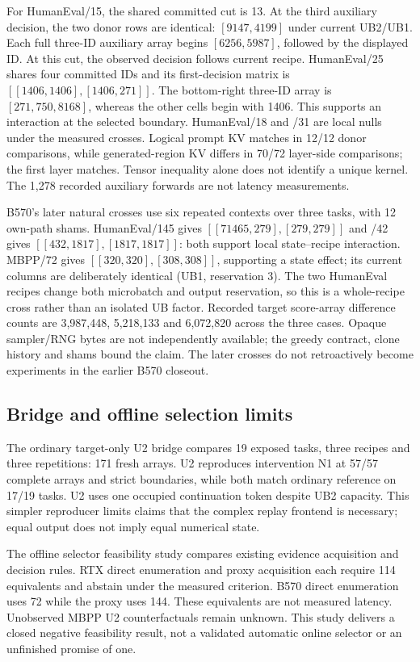 For HumanEval/15, the shared committed cut is 13. At the third auxiliary decision, the two donor rows are identical: $[9147,4199]$ under current UB2/UB1. Each full three-ID auxiliary array begins $[6256,5987]$, followed by the displayed ID. At this cut, the observed decision follows current recipe. HumanEval/25 shares four committed IDs and its first-decision matrix is $[[1406,1406],[1406,271]]$. The bottom-right three-ID array is $[271,750,8168]$, whereas the other cells begin with 1406. This supports an interaction at the selected boundary. HumanEval/18 and /31 are local nulls under the measured crosses. Logical prompt KV matches in 12/12 donor comparisons, while generated-region KV differs in 70/72 layer-side comparisons; the first layer matches. Tensor inequality alone does not identify a unique kernel. The 1,278 recorded auxiliary forwards are not latency measurements.

B570's later natural crosses use six repeated contexts over three tasks, with 12 own-path shams. HumanEval/145 gives $[[71465,279],[279,279]]$ and /42 gives $[[432,1817],[1817,1817]]$: both support local state--recipe interaction. MBPP/72 gives $[[320,320],[308,308]]$, supporting a state effect; its current columns are deliberately identical (UB1, reservation 3). The two HumanEval recipes change both microbatch and output reservation, so this is a whole-recipe cross rather than an isolated UB factor. Recorded target score-array difference counts are 3,987,448, 5,218,133 and 6,072,820 across the three cases. Opaque sampler/RNG bytes are not independently available; the greedy contract, clone history and shams bound the claim. The later crosses do not retroactively become experiments in the earlier B570 closeout.

\subsection{Bridge and offline selection limits}
\label{supp:bridge_selector}
The ordinary target-only U2 bridge compares 19 exposed tasks, three recipes and three repetitions: 171 fresh arrays. U2 reproduces intervention N1 at 57/57 complete arrays and strict boundaries, while both match ordinary reference on 17/19 tasks. U2 uses one occupied continuation token despite UB2 capacity. This simpler reproducer limits claims that the complex replay frontend is necessary; equal output does not imply equal numerical state.

The offline selector feasibility study compares existing evidence acquisition and decision rules. RTX direct enumeration and proxy acquisition each require 114 equivalents and abstain under the measured criterion. B570 direct enumeration uses 72 while the proxy uses 144. These equivalents are not measured latency. Unobserved MBPP U2 counterfactuals remain unknown. This study delivers a closed negative feasibility result, not a validated automatic online selector or an unfinished promise of one.
